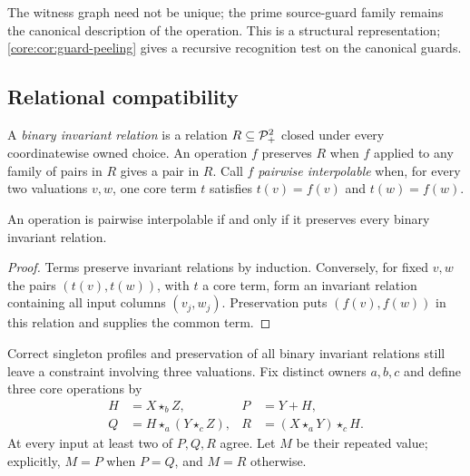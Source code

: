 The witness graph need not be unique; the prime source-guard family
remains the canonical description of the operation. This is a structural
representation; \cref{core:cor:guard-peeling} gives a recursive recognition
test on the canonical guards.







\subsection{Relational compatibility}\label{app:core-pairwise}

A \emph{binary invariant relation} is a relation $R\subseteq\mathcal P_+^2$
closed under every coordinatewise owned choice. An operation $f$ preserves
$R$ when $f$ applied to any family of pairs in $R$ gives a pair in $R$.
Call $f$ \emph{pairwise interpolable} when, for every two valuations $v,w$,
one core term $t$ satisfies $t(v)=f(v)$ and $t(w)=f(w)$.

\begin{lemma}\label{core:lem:binary-interpolation}
An operation is pairwise interpolable if and only if it preserves every
binary invariant relation.
\end{lemma}
\begin{proof}
Terms preserve invariant relations by induction. Conversely, for fixed
$v,w$ the pairs $(t(v),t(w))$, with $t$ a core term, form an invariant
relation containing all input columns $(v_j,w_j)$. Preservation puts
$(f(v),f(w))$ in this relation and supplies the common term.
\end{proof}

Correct singleton profiles and preservation of all binary invariant relations
still leave a constraint involving three valuations. Fix distinct owners $a,b,c$
and define three core operations by
\[
\begin{aligned}
 H&=X\star_b Z, & P&=Y+H,\\
 Q&=H\star_a(Y\star_c Z), &
 R&=(X\star_a Y)\star_c H.
\end{aligned}
\]
At every input at least two of $P,Q,R$ agree. Let $M$ be their repeated
value; explicitly, $M=P$ when $P=Q$, and $M=R$ otherwise.

